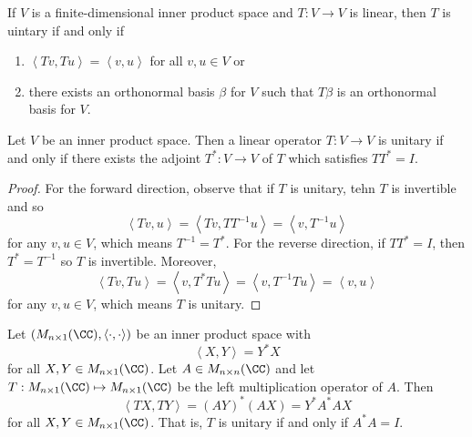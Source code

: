 \documentclass[linearalgebra]{subfiles}
\begin{document}
    \begin{remark}
        If $V$ is a finite-dimensional inner product space and $T:V\to V$ is linear, then $T$ is uintary if and only if
        \begin{enumerate}
            \item $\left\langle Tv, Tu\right\rangle = \left\langle v, u\right\rangle$ for all $v,u\in V$ or
            \item there exists an orthonormal basis $\beta$ for $V$ such that $T\beta$ is an orthonormal basis for $V$.
        \end{enumerate}
    \end{remark}

    \begin{prop}{}
        Let $V$ be an inner product space. Then a linear operator $T:V\to V$ is unitary if and only if there exists the adjoint $T^*:V\to V$ of $T$ which satisfies $TT^* = I$.
    \end{prop}

    \begin{proof}
        For the forward direction, observe that if $T$ is unitary, tehn $T$ is invertible and so
        \begin{equation*}
            \left\langle Tv, u\right\rangle = \left\langle Tv, TT^{-1}u\right\rangle = \left\langle v, T^{-1}u\right\rangle
        \end{equation*}
        for any $v,u\in V$, which means $T^{-1} = T^*$. For the reverse direction, if $TT^* = I$, then $T^*=T^{-1}$ so $T$ is invertible. Moreover,
        \begin{equation*}
            \left\langle Tv, Tu\right\rangle = \left\langle v, T^*Tu\right\rangle = \left\langle v, T^{-1}Tu\right\rangle = \left\langle v, u\right\rangle 
        \end{equation*}
        for any $v,u\in V$, which means $T$ is unitary.
    \end{proof}

    \begin{example}
        Let $\left( M_{n\times 1}(\CC) , \left\langle \cdot, \cdot\right\rangle  \right)$ be an inner product space with
        \begin{equation*}
            \left\langle X, Y\right\rangle = Y^*X
        \end{equation*}
        for all $X,Y\in M_{n\times 1}(\CC)$. Let $A\in M_{n\times n}(\CC)$ and let $T:M_{n\times 1}(\CC)\mapsto M_{n\times 1}(\CC)$ be the left multiplication operator of $A$. Then
        \begin{equation*}
            \left\langle TX, TY\right\rangle = \left( AY \right) ^*\left( AX \right) = Y^*A^*AX
        \end{equation*}
        for all $X,Y\in M_{n\times 1}(\CC)$. That is, $T$ is unitary if and only if $A^*A=I$.
    \end{example}
\end{document}
